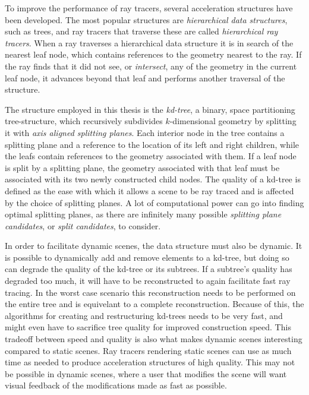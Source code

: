 
To improve the performance of ray tracers, several acceleration structures have
been developed. The most popular structures are \textit{hierarchical data
  structures}, such as trees, and ray tracers that traverse these are called
\textit{hierarchical ray tracers}. When a ray traverses a hierarchical data
structure it is in search of the nearest leaf node, which contains references to
the geometry nearest to the ray. If the ray finds that it did not see, or
\textit{intersect}, any of the geometry in the current leaf node, it advances
beyond that leaf and performs another traversal of the structure.

The structure employed in this thesis is the \textit{kd-tree}, a binary, space
partitioning tree-structure, which recursively subdivides $k$-dimensional
geometry by splitting it with \textit{axis aligned splitting planes}. Each
interior node in the tree contains a splitting plane and a reference to the
location of its left and right children, while the leafs contain references to
the geometry associated with them. 
If a leaf node is split by a splitting plane, the geometry associated with that
leaf must be associated with its two newly constructed child nodes. The quality
of a kd-tree is defined as the ease with which it allows a scene to be ray
traced and is affected by the choice of splitting planes. A lot of computational
power can go into finding optimal splitting planes, as there are infinitely many
possible \textit{splitting plane candidates}, or \textit{split candidates}, to
consider.


In order to facilitate dynamic scenes, the data structure must also be
dynamic. It is possible to dynamically add and remove elements to a kd-tree, but
doing so can degrade the quality of the kd-tree or its subtrees. If a subtree's
quality has degraded too much, it will have to be reconstructed to again
facilitate fast ray tracing. In the worst case scenario this reconstruction
needs to be performed on the entire tree and is equivelant to a complete
reconstruction. Because of this, the algorithms for creating and restructuring
kd-trees needs to be very fast, and might even have to sacrifice tree quality
for improved construction speed. This tradeoff between speed and quality is also
what makes dynamic scenes interesting compared to static scenes. Ray tracers
rendering static scenes can use as much time as needed to produce acceleration
structures of high quality. This may not be possible in dynamic scenes, where a
user that modifies the scene will want visual feedback of the modifications made
as fast as possible.

